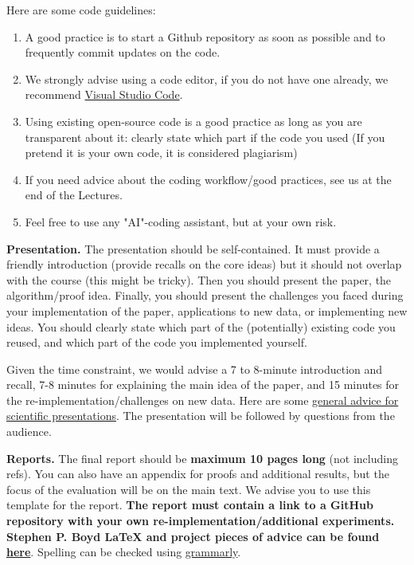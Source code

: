 \documentclass{article}
\begin{document}
Here are some code guidelines:
\begin{enumerate}
    \item A good practice is to start a Github repository as soon as possible and to frequently commit updates on the code.
    \item We strongly advise using a code editor, if you do not have one already, we recommend \href{https://code.visualstudio.com/}{Visual Studio Code}.
    \item Using existing open-source code is a good practice as long as you are transparent about it: clearly state which part if the code you used (If you pretend it is your own code, it is considered plagiarism) 
    \item 
	If you need advice about the coding workflow/good practices, see us at the end of the Lectures.
    \item Feel free to use any "AI"-coding assistant, but at your own risk.
\end{enumerate}




\textbf{Presentation.}
The presentation should be self-contained. It must provide a friendly introduction (provide recalls on the core ideas) but it should not overlap with the course (this might be tricky). Then you should present the paper, the algorithm/proof idea. Finally, you should present the challenges you faced during your implementation of the paper, applications to new data, or implementing new ideas.
You should clearly state which part of the (potentially) existing code you reused, and which part of the code you implemented yourself.

Given the time constraint, we would advise a 7 to 8-minute introduction and recall, 7-8 minutes for explaining the main idea of the paper, and 15 minutes for the re-implementation/challenges on new data.
Here are some \href{https://mathurinm.github.io/presentation_advice/}{general advice for scientific presentations}.
The presentation will be followed by questions from the audience.

\textbf{Reports.}
The final report should be \textbf{maximum 10 pages long} (not including refs). 
You can also have an appendix for proofs and additional results, but the focus of the evaluation will be on the main text.
We advise you to use this template for the report.
\textbf{The report must contain a link to a GitHub repository with your own re-implementation/additional experiments.}
\textbf{Stephen P. Boyd LaTeX and project pieces of advice can be found \href{https://youtu.be/Kwli6FkYQYY?t=164}{here}}.  
Spelling can be checked using \href{https://www.grammarly.com/}{grammarly}.
\end{document}
